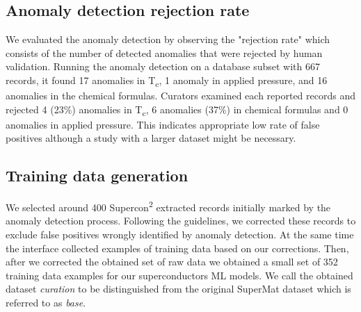\documentclass[]{interact}
\theoremstyle{plain} %
\theoremstyle{definition}
\theoremstyle{remark}
\begin{document}
\subsection{Anomaly detection rejection rate}
\label{subsec:anomaly-detection-evaluation}

We evaluated the anomaly detection by observing the "rejection rate" which consists of the number of detected anomalies that were rejected by human validation. 
Running the anomaly detection on a database subset with 667 records, it found 17 anomalies in T\textsubscript{c}, 1 anomaly in applied pressure, and 16 anomalies in the chemical formulas. 
Curators examined each reported records and rejected 4 (23\%) anomalies in T\textsubscript{c}, 6 anomalies (37\%) in chemical formulas and 0 anomalies in applied pressure. 
This indicates appropriate low rate of false positives although a study with a larger dataset might be necessary. 

\subsection{Training data generation}
\label{subsec:training-data-generation-evaluation}
We selected around 400 Supercon\textsuperscript{2} extracted records initially marked by the anomaly detection process. 
Following the guidelines, we corrected these records to exclude false positives wrongly identified by anomaly detection.  
At the same time the interface collected examples of training data based on our corrections. 
Then, after we corrected the obtained set of raw data we obtained a small set of 352 training data examples for our superconductors ML models. 
We call the obtained dataset \emph{curation} to be distinguished from the original SuperMat dataset which is referred to as \emph{base}.
\end{document}
